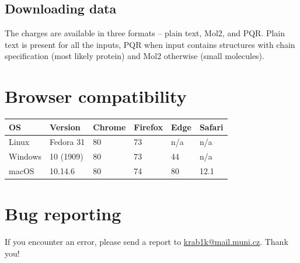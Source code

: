 \documentclass[oneside]{memoir}
\begin{document}
\subsection*{Downloading data}
The charges are available in three formats – plain text, Mol2, and PQR. Plain text is present for all the inputs, PQR when input contains structures with chain specification (most likely protein) and Mol2 otherwise (small molecules).

\section*{Browser compatibility}

\begin{tabular}{llllll}
\toprule
OS & Version & Chrome & Firefox & Edge & Safari\\
\midrule
Linux & Fedora 31 & 80 & 73 & n/a & n/a\\
Windows & 10 (1909) & 80 & 73 & 44 & n/a\\
macOS & 10.14.6 & 80 & 74 & 80 & 12.1\\
\bottomrule

\end{tabular}

\section*{Bug reporting}
If you encounter an error, please send a report to \href{mailto:krab1k@mail.muni.cz}{krab1k@mail.muni.cz}. Thank you!
\end{document}
